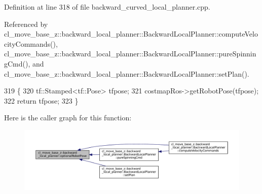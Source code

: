 Definition at line 318 of file backward\+\_\+curved\+\_\+local\+\_\+planner.\+cpp.



Referenced by cl\+\_\+move\+\_\+base\+\_\+z\+::backward\+\_\+local\+\_\+planner\+::\+Backward\+Local\+Planner\+::compute\+Velocity\+Commands(), cl\+\_\+move\+\_\+base\+\_\+z\+::backward\+\_\+local\+\_\+planner\+::\+Backward\+Local\+Planner\+::pure\+Spinning\+Cmd(), and cl\+\_\+move\+\_\+base\+\_\+z\+::backward\+\_\+local\+\_\+planner\+::\+Backward\+Local\+Planner\+::set\+Plan().


\begin{DoxyCode}
319         \{
320             tf::Stamped<tf::Pose> tfpose;
321             costmapRos->getRobotPose(tfpose);
322             \textcolor{keywordflow}{return} tfpose;
323         \}
\end{DoxyCode}
Here is the caller graph for this function\+:
\nopagebreak
\begin{figure}[H]
\begin{center}
\leavevmode
\includegraphics[width=350pt]{namespacecl__move__base__z_1_1backward__local__planner_afd5bb2a0d144f7b89f4215fbcb1fbe69_icgraph}
\end{center}
\end{figure}
